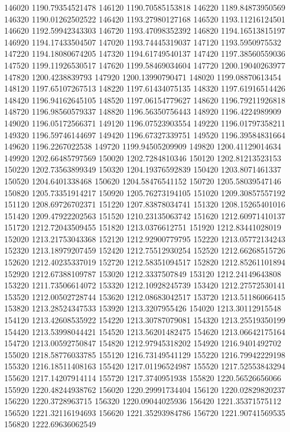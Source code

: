 {146020 1190.79354521478
146120 1190.70585153818
146220 1189.84873950569
146320 1190.01262502522
146420 1193.27980127168
146520 1193.11216124501
146620 1192.59942343303
146720 1193.47098352392
146820 1194.16513815197
146920 1194.17433504507
147020 1193.74445319037
147120 1193.5950975532
147220 1194.18080674205
147320 1194.61749540137
147420 1197.38560559036
147520 1199.11926530517
147620 1199.58469034604
147720 1200.19040263977
147820 1200.4238839793
147920 1200.13990790471
148020 1199.08870613454
148120 1197.65107267513
148220 1197.61434075135
148320 1197.61916514426
148420 1196.94162645105
148520 1197.06154779627
148620 1196.79211926818
148720 1196.98560579337
148820 1196.56350756443
148920 1196.4224989909
149020 1196.05172566371
149120 1196.07523903554
149220 1196.01797358211
149320 1196.59746144697
149420 1196.67327339751
149520 1196.39584831664
149620 1196.2267022538
149720 1199.94505209909
149820 1200.41129014634
149920 1202.66485797569
150020 1202.7284810346
150120 1202.81213523153
150220 1202.73563899349
150320 1204.19376592839
150420 1203.8071461337
150520 1204.6401338468
150620 1204.58476541152
150720 1205.58039547146
150820 1205.73351914217
150920 1205.76273194105
151020 1209.30857557192
151120 1208.69726702371
151220 1207.83878034741
151320 1208.15265401016
151420 1209.47922202563
151520 1210.23135063742
151620 1212.60971410137
151720 1212.72043509455
151820 1213.0376612751
151920 1212.83441028019
152020 1213.21753043368
152120 1212.92900779795
152220 1213.05772134243
152320 1213.18979207459
152420 1212.75512930254
152520 1212.66268515726
152620 1212.40235337019
152720 1212.58351094517
152820 1212.85261101894
152920 1212.67388109787
153020 1212.3337507849
153120 1212.24149643808
153220 1211.73506614072
153320 1212.10928245739
153420 1212.27572530141
153520 1212.00502728744
153620 1212.08683042517
153720 1213.51186066415
153820 1213.28524347533
153920 1213.3207955426
154020 1213.30112915548
154120 1213.42608535922
154220 1213.30787079081
154320 1213.25519350199
154420 1213.53998044421
154520 1213.56201482475
154620 1213.06642175164
154720 1213.00592750847
154820 1212.97945318202
154920 1216.9401492702
155020 1218.58776033785
155120 1216.73149541129
155220 1216.79942229198
155320 1216.18511408163
155420 1217.01196524987
155520 1217.52553843294
155620 1217.14207914114
155720 1217.3740951938
155820 1220.56526656066
155920 1220.48244938762
156020 1220.29991734404
156120 1220.02829820237
156220 1220.3728963715
156320 1220.09044025936
156420 1221.35371575112
156520 1221.32116194693
156620 1221.35293984786
156720 1221.90741569535
156820 1222.69636062549
}

